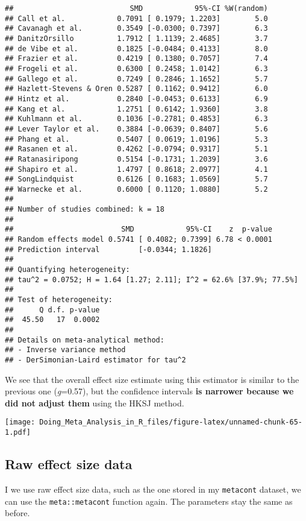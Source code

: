 \documentclass[]{book}
\theoremstyle{definition}
\theoremstyle{definition}
\theoremstyle{definition}
\theoremstyle{remark}
\begin{document}
\begin{verbatim}
##                           SMD            95%-CI %W(random)
## Call et al.            0.7091 [ 0.1979; 1.2203]        5.0
## Cavanagh et al.        0.3549 [-0.0300; 0.7397]        6.3
## DanitzOrsillo          1.7912 [ 1.1139; 2.4685]        3.7
## de Vibe et al.         0.1825 [-0.0484; 0.4133]        8.0
## Frazier et al.         0.4219 [ 0.1380; 0.7057]        7.4
## Frogeli et al.         0.6300 [ 0.2458; 1.0142]        6.3
## Gallego et al.         0.7249 [ 0.2846; 1.1652]        5.7
## Hazlett-Stevens & Oren 0.5287 [ 0.1162; 0.9412]        6.0
## Hintz et al.           0.2840 [-0.0453; 0.6133]        6.9
## Kang et al.            1.2751 [ 0.6142; 1.9360]        3.8
## Kuhlmann et al.        0.1036 [-0.2781; 0.4853]        6.3
## Lever Taylor et al.    0.3884 [-0.0639; 0.8407]        5.6
## Phang et al.           0.5407 [ 0.0619; 1.0196]        5.3
## Rasanen et al.         0.4262 [-0.0794; 0.9317]        5.1
## Ratanasiripong         0.5154 [-0.1731; 1.2039]        3.6
## Shapiro et al.         1.4797 [ 0.8618; 2.0977]        4.1
## SongLindquist          0.6126 [ 0.1683; 1.0569]        5.7
## Warnecke et al.        0.6000 [ 0.1120; 1.0880]        5.2
## 
## Number of studies combined: k = 18
## 
##                         SMD            95%-CI    z  p-value
## Random effects model 0.5741 [ 0.4082; 0.7399] 6.78 < 0.0001
## Prediction interval         [-0.0344; 1.1826]              
## 
## Quantifying heterogeneity:
## tau^2 = 0.0752; H = 1.64 [1.27; 2.11]; I^2 = 62.6% [37.9%; 77.5%]
## 
## Test of heterogeneity:
##      Q d.f. p-value
##  45.50   17  0.0002
## 
## Details on meta-analytical method:
## - Inverse variance method
## - DerSimonian-Laird estimator for tau^2
\end{verbatim}

We see that the overall effect size estimate using this estimator is
similar to the previous one (\emph{g}=0.57), but the confidence
intervals \textbf{is narrower because we did not adjust them} using the
HKSJ method.

\texttt{[image: Doing\_Meta\_Analysis\_in\_R\_files/figure-latex/unnamed-chunk-65-1.pdf]}

\hypertarget{random.raw}{\subsection{Raw effect size
data}\label{random.raw}}

I we use raw effect size data, such as the one stored in my
\texttt{metacont} dataset, we can use the \texttt{meta::metacont}
function again. The parameters stay the same as before.
\end{document}
